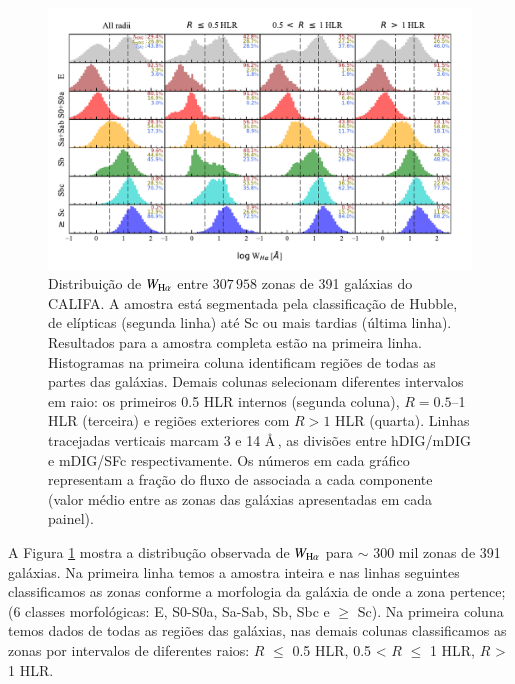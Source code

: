 \begin{figure}
\includegraphics[scale=0.9]{figuras/fig_WHa_histograms_per_morftype_and_radius_cumulFHa.pdf}
\caption[Histogramas de $W_{{\rm H}\alpha}$]
{Distribuição de $W_{\Ha}$ entre $307\,958$ zonas de 391 galáxias do CALIFA. A amostra está segmentada pela classificação de Hubble, de elípticas (segunda linha) até Sc ou mais tardias (última linha). Resultados para a amostra completa estão na primeira linha. Histogramas na primeira coluna identificam regiões de todas as partes das galáxias. Demais colunas selecionam diferentes intervalos em raio: os primeiros 0.5 HLR internos (segunda coluna), $R = 0.5$--1 HLR (terceira) e regiões exteriores com $R > 1$ HLR (quarta). Linhas tracejadas verticais marcam 3 e 14 \AA\,, as divisões entre hDIG/mDIG e mDIG/SFc respectivamente. Os números em cada gráfico representam a fração do fluxo de \Ha associada a cada componente (valor médio entre as zonas das galáxias apresentadas em cada painel).}
 \label{fig:WHaDistrib_ALLgals}
\end{figure}

A Figura \ref{fig:WHaDistrib_ALLgals} mostra a distribução observada de $W_{\Ha}$ para $\sim$ 300 mil zonas de 391 galáxias. Na primeira linha temos a amostra inteira e nas linhas seguintes classificamos as zonas conforme a morfologia da galáxia de onde a zona pertence; (6 classes morfológicas: E, S0-S0a, Sa-Sab, Sb, Sbc e $\ge$ Sc). Na primeira coluna temos dados de todas as regiões das galáxias, nas demais colunas classificamos as zonas por intervalos de diferentes raios: $R$ $\le$ 0.5 HLR, 0.5 < $R$ $\le$ 1 HLR, $R$ > 1 HLR.

